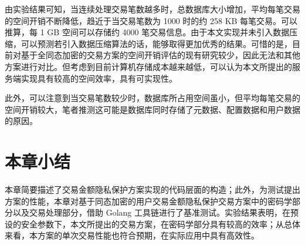 由实验结果可知，当连续处理交易笔数越多时，总数据库大小增加，平均每笔交易的空间开销不断降低，趋近于当交易笔数为 1000 时的约 258 KB 每笔交易。可以推算，每 1 GB 空间可以存储约 4000 笔交易信息。由于本文实现并未引入数据压缩，可以预测若引入数据压缩算法的话，能够取得更加优秀的结果。可惜的是，目前对基于全同态加密的交易方案的空间开销评估的现有研究较少，因此无法和其他方案进行对比。但考虑到目前计算机存储成本越来越低，可以认为本文所提出的服务端实现具有较高的空间效率，具有可实现性。

此外，可以注意到当交易笔数较少时，数据库所占用空间虽小，但平均每笔交易的空间开销较大，笔者推测这可能是数据库同时存储了元数据、配置数据和用户数据的原因。

\section{本章小结}

本章简要描述了交易金额隐私保护方案实现的代码层面的构造；此外，为测试提出方案的性能，本章对基于同态加密的用户交易金额隐私保护交易方案中的密码学部分以及交易处理部分，借助 Golang 工具链进行了基准测试。实验结果表明，在预设的安全参数下，本文所提出的交易方案，在密码学部分具有较高的效率；从总体来看，本方案的单次交易性能也符合预期，在实际应用中具有高效性。
